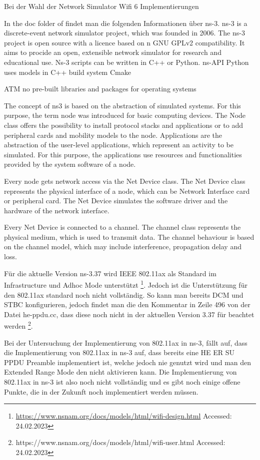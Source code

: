 \documentclass[]{nsm-thesis}
\begin{document}
Bei der Wahl der Network Simulator Wifi 6 Implementierungen 



In the doc folder of  \cite{noauthor_files_nodate} findet man die folgenden Informationen über ns-3.
ns-3 is a discrete-event network simulator project, which was founded in 2006.
The ns-3 project is open source with a licence based on n GNU GPLv2 compatibility.
It aims to procide an open, extensible network simulator for research and educational use. Ns-3 scripts can be written in C++ or Python.
ns-API Python uses models in C++
build system Cmake

ATM no pre-built libraries and packages for operating systems
 
The concept of ns3 is based on the abstraction of simulated systems.
For this purpose, the term node was introduced for basic computing devices. The Node class offers the possibility to
install protocol stacks and applications or to add peripheral cards and mobility models to the node.
Applications are the abstraction of the user-level applications, which represent an activity to be simulated.
For this purpose, the applications use resources and functionalities provided by the system software of a node.

Every node gets network access via the Net Device class. The Net Device class represents the physical interface of a node,
which can be Network Interface card or peripheral card. The Net Device simulates the software driver and the hardware of the network interface.

Every Net Device is connected to a channel. The channel class represents the physical medium, which is used to transmit data. The channel behaviour is based
on the channel model, which may include interference, propagation delay and loss.

Für die aktuelle Version ns-3.37 wird IEEE 802.11ax als Standard im Infrastructure und Adhoc Mode unterstützt \footnote{\url{https://www.nsnam.org/docs/models/html/wifi-design.html} Accessed: 24.02.2023}.
Jedoch ist die Unterstützung für den 802.11ax standard noch nicht vollständig. So kann man bereits DCM und STBC konfigurieren, jedoch findet man die den Kommentar in Zeile 496 von der Datei he-ppdu.cc, dass diese noch nicht in der aktuellen Version 3.37 für beachtet werden \footnote{https://www.nsnam.org/docs/models/html/wifi-user.html Accessed: 24.02.2023}.

Bei der Untersuchung der Implementierung von 802.11ax in ns-3, fällt auf, dass die Implementierung von 802.11ax in ns-3 auf, dass bereits eine HE ER SU \ac{PPDU} Preamble implementiert ist, welche jedoch nie genutzt wird und man den Extended Range Mode
den nicht aktivieren kann. Die Implementierung von 802.11ax in ns-3 ist also noch nicht vollständig und es gibt noch einige offene Punkte, die in der Zukunft noch implementiert werden müssen.
\end{document}
